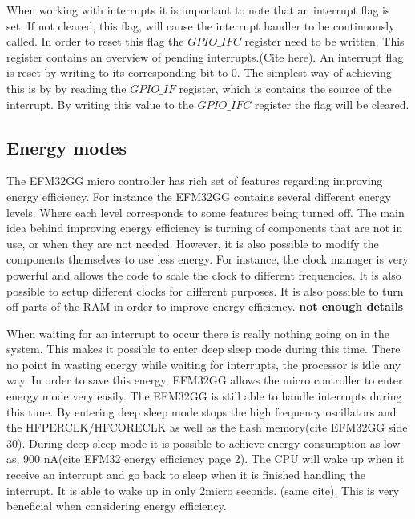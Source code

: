 When working with interrupts it is important to note that an interrupt flag is set. If not cleared, this flag, will cause the interrupt handler to be continuously called. In order to reset this flag the $GPIO\_IFC$ register need to be written. This register contains an overview of pending interrupts.(Cite here). An interrupt flag is reset by writing to its corresponding bit to 0.  The simplest way of achieving this is by by reading the $GPIO\_IF$ register, which is contains the source of the interrupt. By writing this value to the $GPIO\_IFC$ register the flag will be cleared.  





\subsection{Energy modes}\label{ch:energy_modes} 
The EFM32GG micro controller has rich set of features regarding improving energy efficiency. For instance the EFM32GG contains several different energy levels. Where each level corresponds to some features being turned off. The main idea behind improving energy efficiency is turning of components that are not in use, or when they are not needed. However, it is also possible to modify the components themselves to use less energy. For instance, the clock manager is very powerful and allows the code to scale the clock to different frequencies. It is also possible to setup different clocks for different purposes. It is also possible to turn off parts of the RAM in order to improve energy efficiency. {\bf not enough details}


When waiting for an interrupt to occur there is really nothing going on in the system. This makes it possible to enter deep sleep mode during this time. There no point in wasting energy while waiting for interrupts, the processor is idle any way. In order to save this energy, EFM32GG allows the micro controller to enter energy mode very easily. The EFM32GG is still able to handle interrupts during this time. By entering deep sleep mode stops the high frequency oscillators and the HFPERCLK/HFCORECLK as well as the flash memory(cite EFM32GG side 30). During deep sleep mode it is possible to achieve energy consumption as low as, 900 nA(cite EFM32 energy efficiency page 2). The CPU will wake up when it receive an interrupt and go back to sleep when it is finished handling the interrupt. It is able to wake up in only 2micro seconds. (same cite). This is very beneficial when considering energy efficiency.   

